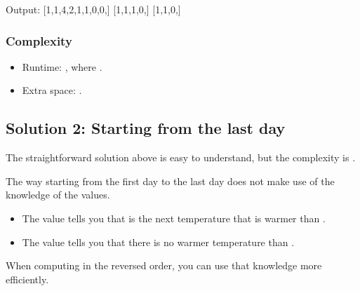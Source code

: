 \documentclass[letterpaper,12pt,english]{book}
\begin{document}
\begin{sphinxVerbatim}[commandchars=\\\{\}]
Output:
[1,1,4,2,1,1,0,0,]
[1,1,1,0,]
[1,1,0,]
\end{sphinxVerbatim}


\subsubsection{Complexity}
\label{\detokenize{Array/01_ARR_739_Daily_Temperatures:complexity}}\begin{itemize}
\item {} 
\sphinxAtStartPar
Runtime: , where .

\item {} 
\sphinxAtStartPar
Extra space: .

\end{itemize}


\subsection{Solution 2: Starting from the last day}
\label{\detokenize{Array/01_ARR_739_Daily_Temperatures:solution-2-starting-from-the-last-day}}
\sphinxAtStartPar
The straightforward solution above is easy to understand, but the complexity is .

\sphinxAtStartPar
The way starting from the first day to the last day does not make use of the knowledge of the  values.
\begin{itemize}
\item {} 
\sphinxAtStartPar
The value  tells you that  is the next temperature that is warmer than .

\item {} 
\sphinxAtStartPar
The value  tells you that there is no warmer temperature than .

\end{itemize}

\sphinxAtStartPar
When computing  in the reversed order, you can use that knowledge more efficiently.
\end{document}

